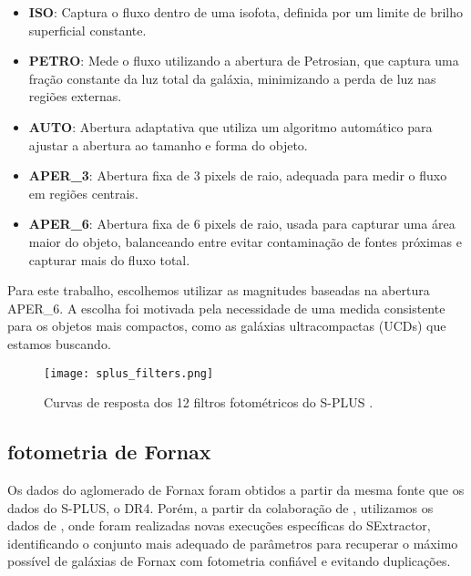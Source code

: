 \begin{itemize}
    \item \textbf{ISO}: Captura o fluxo dentro de uma isofota, definida por um limite de brilho superficial constante.
    \item \textbf{PETRO}: Mede o fluxo utilizando a abertura de Petrosian, que captura uma fração constante da luz total da galáxia, minimizando a perda de luz nas regiões externas.
    \item \textbf{AUTO}: Abertura adaptativa que utiliza um algoritmo automático para ajustar a abertura ao tamanho e forma do objeto.
    \item \textbf{APER\_3}: Abertura fixa de 3 pixels de raio, adequada para medir o fluxo em regiões centrais.
    \item \textbf{APER\_6}: Abertura fixa de 6 pixels de raio, usada para capturar uma área maior do objeto, balanceando entre evitar contaminação de fontes próximas e capturar mais do fluxo total.
\end{itemize}

Para este trabalho, escolhemos utilizar as magnitudes baseadas na abertura APER\_6. A escolha foi motivada pela necessidade de uma medida consistente para os objetos mais compactos, como as galáxias ultracompactas (UCDs) que estamos buscando.

\begin{figure}[!ht]
    \begin{center}
    \texttt{[image: splus\_filters.png]}
    \caption[]{Curvas de resposta dos 12 filtros fotométricos do S-PLUS \citep{splus_DR4_footprint}.}
    \label{splus_filters}
    \end{center}
\end{figure}

\subsection{fotometria de Fornax}\label{sec:Fornax_data}
Os dados do aglomerado de Fornax foram obtidos a partir da mesma fonte que os dados do S-PLUS, o DR4. Porém, a partir da colaboração de \cite{castelli2024splusfornaxprojectsfp}, utilizamos os dados de \cite{haack2024splusfornaxprojectsfp}, onde foram realizadas novas execuções específicas do SExtractor, identificando o conjunto mais adequado de parâmetros para recuperar o máximo possível de galáxias de Fornax com fotometria confiável e evitando duplicações.

